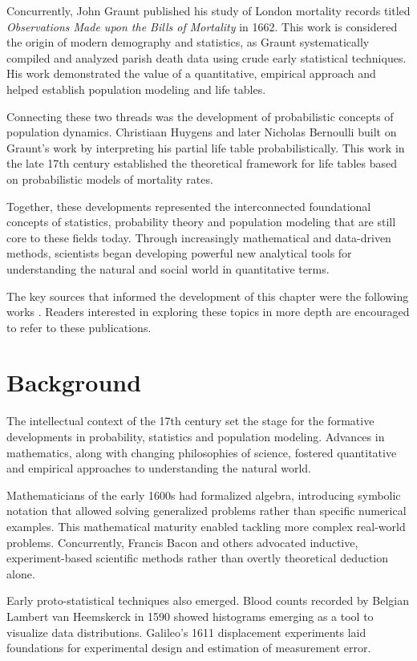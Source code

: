 Concurrently, John Graunt published his study of London mortality records titled \emph{Observations Made upon the Bills of Mortality} in 1662. This work is considered the origin of modern demography and statistics, as Graunt systematically compiled and analyzed parish death data using crude early statistical techniques. His work demonstrated the value of a quantitative, empirical approach and helped establish population modeling and life tables.

Connecting these two threads was the development of probabilistic concepts of population dynamics. Christiaan Huygens and later Nicholas Bernoulli built on Graunt's work by interpreting his partial life table probabilistically. This work in the late 17th century established the theoretical framework for life tables based on probabilistic models of mortality rates.

Together, these developments represented the interconnected foundational concepts of statistics, probability theory and population modeling that are still core to these fields today. Through increasingly mathematical and data-driven methods, scientists began developing powerful new analytical tools for understanding the natural and social world in quantitative terms.

The key sources that informed the development of this chapter were the following works \citep{Bacar2011, Kreager1991}. Readers interested in exploring these topics in more depth are encouraged to refer to these publications.

\section{Background}

The intellectual context of the 17th century set the stage for the formative developments in probability, statistics and population modeling. Advances in mathematics, along with changing philosophies of science, fostered quantitative and empirical approaches to understanding the natural world.

Mathematicians of the early 1600s had formalized algebra, introducing symbolic notation that allowed solving generalized problems rather than specific numerical examples. This mathematical maturity enabled tackling more complex real-world problems. Concurrently, Francis Bacon and others advocated inductive, experiment-based scientific methods rather than overtly theoretical deduction alone.

Early proto-statistical techniques also emerged. Blood counts recorded by Belgian Lambert van Heemskerck in 1590 showed histograms emerging as a tool to visualize data distributions. Galileo's 1611 displacement experiments laid foundations for experimental design and estimation of measurement error. 

